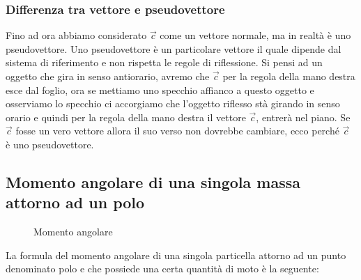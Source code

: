 \subsubsection{Differenza tra vettore e pseudovettore}
Fino ad ora abbiamo considerato $\vec{c}$ come un vettore normale, ma in realtà è uno pseudovettore.
Uno pseudovettore è un particolare vettore il quale dipende dal sistema di riferimento e non rispetta le regole di riflessione.
Si pensi ad un oggetto che gira in senso antiorario, avremo che $\vec{c}$ per la regola della mano destra esce dal foglio, ora se mettiamo uno specchio affianco a questo oggetto e osserviamo lo specchio ci accorgiamo che l'oggetto riflesso stà girando in senso orario e quindi per la regola della mano destra il vettore $\vec{c}$, entrerà nel piano.
Se $\vec{c}$ fosse un vero vettore allora il suo verso non dovrebbe cambiare, ecco perché $\vec{c}$ è uno pseudovettore.


\subsection[Momento angolare di una singola massa]{Momento angolare di una singola massa attorno ad un polo}

\begin{figure}[H]
    \centering
    \caption{Momento angolare}
    \label{fig:momentoAng}
\end{figure}

La formula del momento angolare di una singola particella attorno ad un punto denominato polo e che possiede una certa quantità di moto è la seguente:

